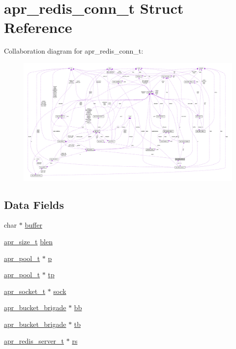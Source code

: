 \hypertarget{structapr__redis__conn__t}{}\section{apr\+\_\+redis\+\_\+conn\+\_\+t Struct Reference}
\label{structapr__redis__conn__t}


Collaboration diagram for apr\+\_\+redis\+\_\+conn\+\_\+t\+:
\nopagebreak
\begin{figure}[H]
\begin{center}
\leavevmode
\includegraphics[width=350pt]{structapr__redis__conn__t__coll__graph}
\end{center}
\end{figure}
\subsection*{Data Fields}
\begin{DoxyCompactItemize}
\item 
char $\ast$ \hyperlink{structapr__redis__conn__t_a25a7acd88a63ab11b24712e2623c0ed6}{buffer}
\item 
\hyperlink{group__apr__platform_gaaa72b2253f6f3032cefea5712a27540e}{apr\+\_\+size\+\_\+t} \hyperlink{structapr__redis__conn__t_a69482f7590735d9bcc318417fe3a219c}{blen}
\item 
\hyperlink{structapr__pool__t}{apr\+\_\+pool\+\_\+t} $\ast$ \hyperlink{structapr__redis__conn__t_a06ccb1cf025823ad16eac565a246be39}{p}
\item 
\hyperlink{structapr__pool__t}{apr\+\_\+pool\+\_\+t} $\ast$ \hyperlink{structapr__redis__conn__t_a38c0d8b5121191c48db206623cb6e6ff}{tp}
\item 
\hyperlink{structapr__socket__t}{apr\+\_\+socket\+\_\+t} $\ast$ \hyperlink{structapr__redis__conn__t_a6c1b20546f3cf15d2b6ac0c95ce6d3a9}{sock}
\item 
\hyperlink{structapr__bucket__brigade}{apr\+\_\+bucket\+\_\+brigade} $\ast$ \hyperlink{structapr__redis__conn__t_a96b3cb0a281dbb20f67b052944005455}{bb}
\item 
\hyperlink{structapr__bucket__brigade}{apr\+\_\+bucket\+\_\+brigade} $\ast$ \hyperlink{structapr__redis__conn__t_a3f4ee64e6b98dff1946e7a38eec7257b}{tb}
\item 
\hyperlink{structapr__redis__server__t}{apr\+\_\+redis\+\_\+server\+\_\+t} $\ast$ \hyperlink{structapr__redis__conn__t_aca9d301e5f56568eaeeb7dcac0dfb8cd}{rs}
\end{DoxyCompactItemize}


